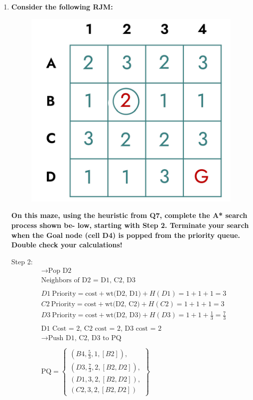 \documentclass[a4paper]{article}
\begin{document}
\begin{sloppypar}
\begin{enumerate}[start=6,label=Q\arabic*,left=0pt]
    \item \textbf{Consider the following RJM:}
    \begin{figure}[H]
        \centering  
        \includegraphics[height=0.2\textheight]{Q8_RJM.png}
        \label{fig:Q8_RJM}
    \end{figure}
    \textbf{On this maze, using the heuristic from Q7, complete the A* search process shown be- low, starting with Step 2. Terminate your search when the Goal node (cell D4) is popped from the priority queue. Double check your calculations!}
    
    \par Step 2:
    \begin{align*}
        &\rightarrow \text{Pop D2} \\
        &\text{Neighbors of D2 = D1, C2, D3} \\\\
        &D1 \: \text{Priority} = \text{cost} + \text{wt(D2, D1)} + H(D1) = 1 + 1 + 1 = 3 \\
        &C2 \: \text{Priority} = \text{cost} + \text{wt(D2, C2)} + H(C2) = 1 + 1 + 1 = 3 \\
        &D3 \: \text{Priority} = \text{cost} + \text{wt(D2, D3)} + H(D3) = 1 + 1 + \frac{1}{3} = \frac{7}{3} \\\\
        &\text{D1 Cost = 2, C2 cost = 2, D3 cost = 2} \\
        &\rightarrow \text{Push D1, C2, D3 to PQ} \\\\
        &\text{PQ} = \left\{\begin{array}{l}
            (B4, \frac{5}{3}, 1, [B2]), \\
            (D3, \frac{7}{3}, 2, [B2, D2]), \\
            (D1, 3, 2, [B2, D2]), \\
            (C2, 3, 2, [B2, D2])
        \end{array}\right\}
    \end{align*}


\end{enumerate}
\end{sloppypar}
\end{document}
